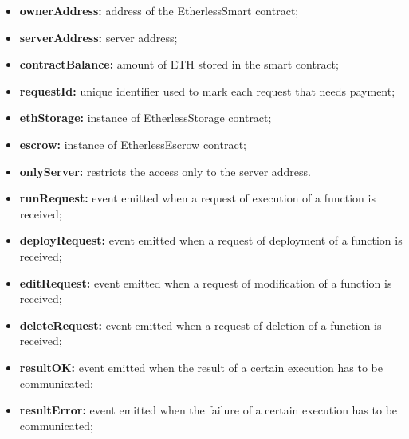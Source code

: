 	\begin{itemize}
		\item \textbf{ownerAddress:} address of the EtherlessSmart contract;
		\item \textbf{serverAddress:} server address;
		\item \textbf{contractBalance:} amount of ETH stored in the smart contract;
		\item \textbf{requestId:} unique identifier used to mark each request that needs payment;
		\item \textbf{ethStorage:} instance of EtherlessStorage contract;
		\item \textbf{escrow:} instance of EtherlessEscrow contract;
	\end{itemize}
	\begin{itemize}
		\item \textbf{onlyServer:} restricts the access only to the server address.
	\end{itemize}
	\begin{itemize}
		\item \textbf{runRequest:} event emitted when a request of execution of a function is received;
		\item \textbf{deployRequest:} event emitted when a request of deployment of a function is received;
		\item \textbf{editRequest:} event emitted when a request of modification of a function is received;
		\item \textbf{deleteRequest:} event emitted when a request of deletion of a function is received;
		\item \textbf{resultOK:} event emitted when the result of a certain execution has to be communicated;
		\item \textbf{resultError:} event emitted when the failure of a certain execution has to be communicated;
	\end{itemize}
